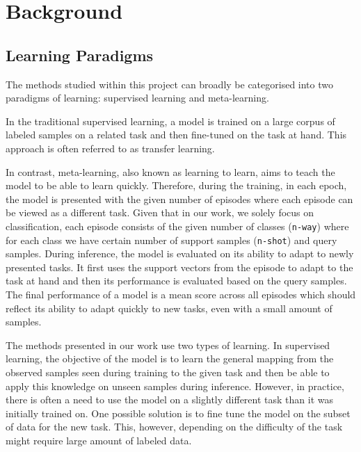 \section{Background}

\subsection{Learning Paradigms}

The methods studied within this project can broadly be categorised into two paradigms of learning: supervised learning and meta-learning.

In the traditional supervised learning, a model is trained on a large corpus of labeled samples on a related task and then fine-tuned on the task at hand. This approach is often referred to as transfer learning. 

In contrast, meta-learning, also known as learning to learn, aims to teach the model to be able to learn quickly. Therefore, during the training, in each epoch, the model is presented with the given number of episodes where each episode can be viewed as a different task. Given that in our work, we solely focus on classification, each episode consists of the given number of classes (\texttt{n-way}) where for each class we have certain number of support samples (\texttt{n-shot}) and query samples. During inference, the model is evaluated on its ability to adapt to newly presented tasks.  It first uses the support vectors from the episode to adapt to the task at hand and then its performance is evaluated based on the query samples. The final performance of a model is a mean score across all episodes which should reflect its ability to adapt quickly to new tasks, even with a small amount of samples.

The methods presented in our work use two types of learning. In supervised learning, the objective of the model is to learn the general mapping from the observed samples seen during training to the given task and then be able to apply this knowledge on unseen samples during inference. However, in practice, there is often a need to use the model on a slightly different task than it was initially trained on. One possible solution is to fine tune the model on the subset of data for the new task. This, however, depending on the difficulty of the task might require large amount of labeled data. 

